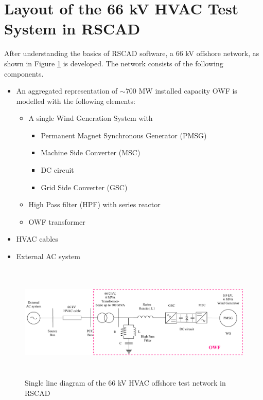 \section{Layout of the 66 kV HVAC Test System in RSCAD}\label{RSCAD_ACsourcemodel}\label{WT1_ACsource_RSCAD_Test_Layout}
After understanding the basics of RSCAD software, a 66 kV offshore network, as shown in Figure \ref{fig:WT1_Model_RSCAD} is developed. The network consists of the following components.

\begin{itemize}
    \item An aggregated representation of $\sim{700}$ MW installed capacity \gls{OWF} is modelled with the following elements:
    \begin{itemize}
        \item A single Wind Generation System with 
    \begin{itemize}
        \item Permanent Magnet Synchronous Generator (\gls{PMSG})
        \item Machine Side Converter (\gls{MSC})
        \item \gls{DC} circuit
        \item Grid Side Converter (\gls{GSC}) 
    \end{itemize}
        \item High Pass filter (\gls{HPF}) with series reactor
        \item \gls{OWF} transformer
    \end{itemize}
    \item \gls{HVAC} cables  
     \item External \gls{AC} system
\end{itemize}

\begin{figure}[H]
\centering
    \includegraphics[height = 5.5cm,width = \textwidth]{Diagrams/Chapter_3/WT1_AC_RSCAD_OWF.pdf}
    \caption{Single line diagram of the 66 kV HVAC offshore test network in RSCAD}
    \label{fig:WT1_Model_RSCAD}
\end{figure}

